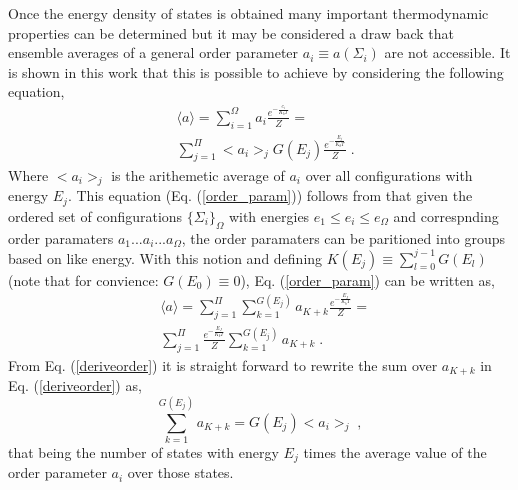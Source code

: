 \documentclass[aps,prl,reprint,superscriptaddress,showkeys]{revtex4-1}
\begin{document}
 Once the energy density of states is obtained many important thermodynamic properties can be determined but it may be considered a draw back that ensemble averages of a general order parameter $a_i \equiv a(\Sigma_i)$ are not accessible.  It is shown in this work that this is possible to achieve by considering the following equation, 
\begin{equation}
\begin{split}
&\langle a \rangle = \sum_{i=1}^{\Omega}a_i \frac{ e^{- \frac{e_i}{K_bT}  }}{Z} = \\
&\sum_{j=1}^{\Pi}<a_i>_{j}G(E_j)\frac{e^{-\frac{E_j}{K_bT} }}{Z} \; . 
\label{order_param}
\end{split} 
\end{equation}
Where $<a_i>_{j}$ is the arithemetic average of $a_i$ over all configurations with energy $E_j$. This equation (Eq. (\ref{order_param})) follows from that given the ordered set of configurations $\{\Sigma_i\}_\Omega$ with energies $e_1 \leq e_i \leq e_\Omega$ and correspnding order paramaters $a_1 ... a_i ... a_\Omega$, the order paramaters can be paritioned into groups based on like energy. With this notion and defining  $K(E_j)\equiv \sum_{l=0}^{j-1}G(E_l)$ (note that for convience: $G(E_0)\equiv 0$), Eq. (\ref{order_param}) can be written as,
\begin{equation}
\begin{split}
&\langle a \rangle =  \sum_{j=1}^{\Pi} \sum_{k=1}^{G(E_j)}a_{K+k} \frac{e^{-\frac{E_J}{K_bT} }}{Z} = \\
&   \sum_{j=1}^{\Pi} \frac{e^{-\frac{E_J}{K_bT} }}{Z} \sum_{k=1}^{G(E_j)}a_{K+k} \;. 
\end{split}
\label{deriveorder}
\end{equation}
From Eq. (\ref{deriveorder})  it is straight forward to rewrite the sum over $a_{K+k}$ in Eq. (\ref{deriveorder}) as, 
\begin{equation}
\sum_{k=1}^{G(E_j)}a_{K+k} =  G(E_j)<a_i>_{j} \;, 
\end{equation}
that being the number of states with energy $E_j$ times the average value of the order parameter  $a_i$ over those states. 
\end{document}
